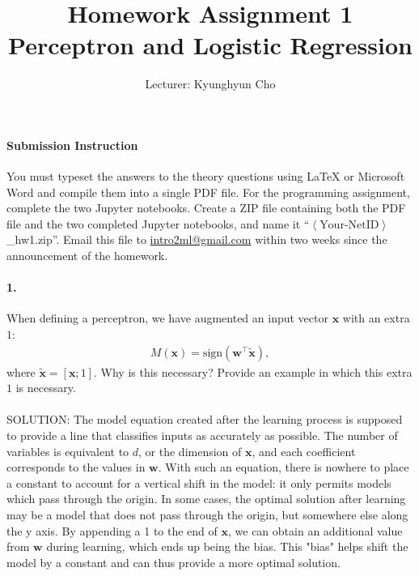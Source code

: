 \documentclass{article}
\newcommand{\vect}[1]{\mathbf{#1}}
\newcommand{\vx}[0]{\vect{x}}
\newcommand{\vw}[0]{\vect{w}}
\newcommand{\sign}{\text{sign}}
\begin{document}
\title{Homework Assignment 1 \\
Perceptron and Logistic Regression}
\author{Lecturer: Kyunghyun Cho}

\maketitle
{}

\paragraph{Submission Instruction} 

You must typeset the answers to the theory questions using LaTeX or Microsoft
Word and compile them into a single PDF file. For the programming assignment,
complete the two Jupyter notebooks.  Create a
ZIP file containing both the PDF file and the two completed Jupyter notebooks,
and name it ``$\left<\text{Your-NetID}\right>$\_hw1.zip''. Email this file to
\url{intro2ml@gmail.com} within two weeks since the announcement of the
homework.


\paragraph{1.} When defining a perceptron, we have augmented an input vector
$\vx$ with an extra $1$: 
\begin{align*}
    M(\vx) = \sign(\vw^\top \tilde{\vx}),
\end{align*}
where $\tilde{\vx} = \left[ \vx; 1\right]$. Why is this necessary? Provide an
example in which this extra $1$ is necessary.
\\
\\
SOLUTION: The model equation created after the learning process is supposed to provide a line that classifies inputs as accurately as possible. The number of variables is equivalent to $d$, or the dimension of $\vx$, and each coefficient corresponds to the values in $\vw$. With such an equation, there is nowhere to place a constant to account for a vertical shift in the model: it only permits models which pass through the origin. In some cases, the optimal solution after learning may be a model that does not pass through the origin, but somewhere else along the y axis. By appending a 1 to the end of $\vx$, we can obtain an additional value from $\vw$ during learning, which ends up being the bias. This "bias" helps shift the model by a constant and can thus provide a more optimal solution. 
\end{document}
